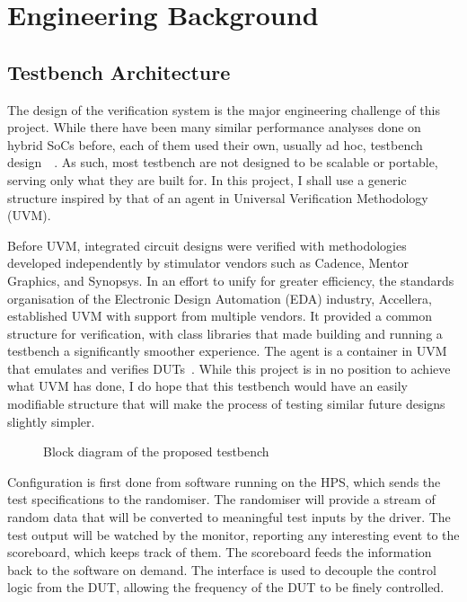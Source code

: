 \section{Engineering Background}

\subsection{Testbench Architecture}
The design of the verification system is the major engineering challenge of this
project.
While there have been many similar performance analyses done on hybrid SoCs
before, each of them used their own, usually ad hoc, testbench
design~\cite{Shi1}~\cite{Li1}.
As such, most testbench are not designed to be scalable or portable, serving
only what they are built for.
In this project, I shall use a generic structure inspired by that of an agent
in Universal Verification Methodology (UVM).

Before UVM, integrated circuit designs were verified with methodologies
developed independently by stimulator vendors such as Cadence, Mentor Graphics,
and Synopsys.
In an effort to unify for greater efficiency, the standards organisation of the
Electronic Design Automation (EDA) industry, Accellera, established UVM with
support from multiple vendors.
It provided a common structure for verification, with class libraries that made
building and running a testbench a significantly smoother experience.
The agent is a container in UVM that emulates and verifies
DUTs~\cite{Accellera1}.
While this project is in no position to achieve what UVM has done, I do hope
that this testbench would have an easily modifiable structure that will make
the process of testing similar future designs slightly simpler.

\begin{figure}[H]
  \centering
  
  \caption{Block diagram of the proposed testbench}
  \label{Block}
\end{figure}

Configuration is first done from software running on the HPS, which sends
the test specifications to the randomiser.
The randomiser will provide a stream of random data that will be converted
to meaningful test inputs by the driver.
The test output will be watched by the monitor, reporting any interesting
event to the scoreboard, which keeps track of them.
The scoreboard feeds the information back to the software on demand.
The interface is used to decouple the control logic from the DUT, allowing
the frequency of the DUT to be finely controlled.


